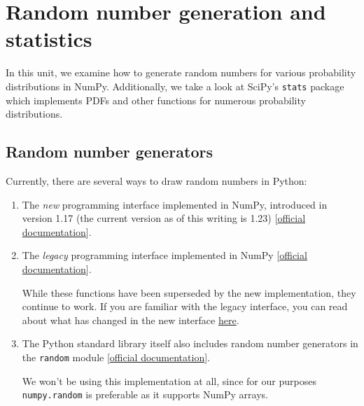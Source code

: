 \documentclass{scrartcl}
\begin{document}
    
    \maketitle
    \tableofcontents
    
    

    
    \hypertarget{random-number-generation-and-statistics}{%
\section{Random number generation and
statistics}\label{random-number-generation-and-statistics}}

In this unit, we examine how to generate random numbers for various
probability distributions in NumPy. Additionally, we take a look at
SciPy's \texttt{stats} package which implements PDFs and other functions
for numerous probability distributions.

\hypertarget{random-number-generators}{%
\subsection{Random number generators}\label{random-number-generators}}

Currently, there are several ways to draw random numbers in Python:

\begin{enumerate}
\def\labelenumi{\arabic{enumi}.}
\item
  The \emph{new} programming interface implemented in NumPy, introduced
  in version 1.17 (the current version as of this writing is 1.23)
  {[}\href{https://numpy.org/doc/stable/reference/random/generator.html}{official
  documentation}{]}.
\item
  The \emph{legacy} programming interface implemented in NumPy
  {[}\href{https://numpy.org/doc/stable/reference/random/legacy.html}{official
  documentation}{]}.

  While these functions have been superseded by the new implementation,
  they continue to work. If you are familiar with the legacy interface,
  you can read about what has changed in the new interface
  \href{https://numpy.org/doc/stable/reference/random/new-or-different.html}{here}.
\item
  The Python standard library itself also includes random number
  generators in the \texttt{random} module
  {[}\href{https://docs.python.org/3/library/random.html\#random.random}{official
  documentation}{]}.

  We won't be using this implementation at all, since for our purposes
  \texttt{numpy.random} is preferable as it supports NumPy arrays.
\end{enumerate}
\end{document}
